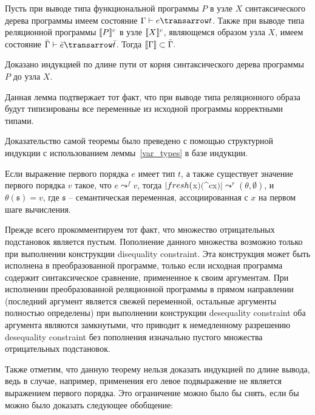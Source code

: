\setarrow{:}
\begin{lemma}
\label{var_types}
\normalfont Пусть при выводе типа функциональной программы $P$ в узле $X$ синтаксического дерева программы имеем состояние $\typed{\Gamma}{e}{t}$. Также при выводе типа реляционной программы $\llbracket{P}\rrbracket^c$ в узле $\llbracket{X}\rrbracket^c$, являющемся образом узла $X$, имеем состояние $\typed{\bar{\Gamma}}{\bar{e}}{\bar{t}}$. Тогда $\llbracket{\Gamma}\rrbracket \subset \bar{\Gamma}.$

Доказано индукцией по длине пути от корня синтаксического дерева программы $P$ до узла $X$.
\end{lemma}

Данная лемма подтвержает тот факт, что при выводе типа реляционного образа будут типизированы все переменные из исходной программы корректными типами.

Доказательство самой теоремы было преведено с помощью структурной индукции с использованием леммы~\ref{var_types} в базе индукции.

\begin{theorem} 
Если выражение первого порядка $e$ имеет тип $t$, а также существует \linebreak значение первого порядка $v$ такое, что \mbox{$e \leadsto^f v$}, тогда \linebreak \mbox{$\lstinline|fresh ($x$) ($^c\;x$)| \leadsto^r (\theta,\emptyset)$}, и \mbox{$\theta(\mathfrak{s})=v$}, где $\mathfrak{s}$ -- семантическая переменная, ассоциированная с $x$ на первом шаге вычисления.
\end{theorem}
  
Прежде всего прокомментируем тот факт, что множество отрицательных подстановок является пустым. Пополнение данного множества возможно только при выполнении конструкции disequality constraint. Эта конструкция может быть исполнена в преобразованной программе, только если исходная программа содержит синтаксическое сравнение, примененное к своим аргументам. При исполнении преобразованной реляционной программы в прямом направлении (последний аргумент является свежей переменной, остальные аргументы полностью определены) при выполнении конструкции desequality constraint оба аргумента являются замкнутыми, что приводит к немедленному разрешению desequality constraint без пополнения изначально пустого множества отрицательных подстановок.

Также отметим, что данную теорему нельзя доказать индукцией по длине вывода, ведь в случае, например, применения его левое подвыражение не является выражением первого порядка. Это ограничение можно было бы снять, если бы можно было доказать следующее обобщение:

